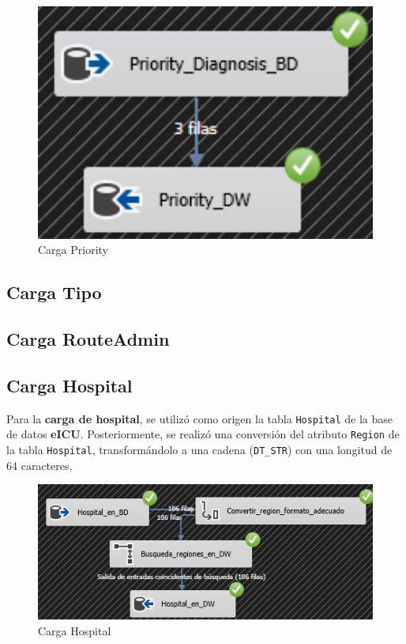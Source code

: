 \documentclass[12pt, a4paper, twoside]{article}
\begin{document}
	\begin{figure}[h!]
		\centering
		\includegraphics[width=1\textwidth]{image/111_carga_priority.png}
		\caption{Carga Priority}
		\label{fig:20}
	\end{figure}
	
	\subsection{Carga Tipo}
	
	\subsection{Carga RouteAdmin}
	
	\subsection{Carga Hospital}
	
	Para la \textbf{carga de hospital}, se utilizó como origen la tabla \texttt{Hospital} de la base de datos \textbf{eICU}. Posteriormente, se realizó una conversión del atributo \texttt{Region} de la tabla \texttt{Hospital}, transformándolo a una cadena (\texttt{DT\_STR}) con una longitud de 64 caracteres. 
	
	\begin{figure}[h!]
		\centering
		\includegraphics[width=1\textwidth]{image/105_cargahospital.png}
		\caption{Carga Hospital}
		\label{fig:16}
	\end{figure}
	
\end{document}
